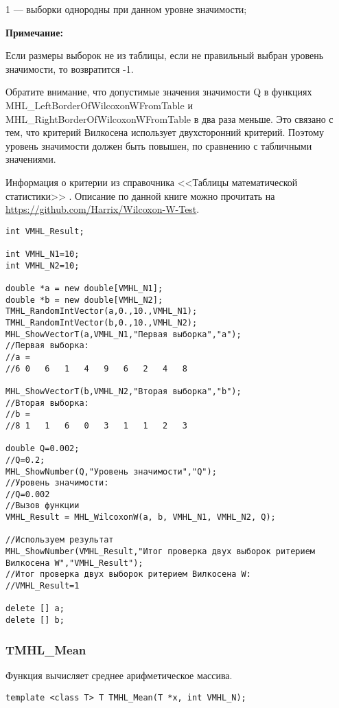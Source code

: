 \documentclass[a4paper,12pt]{article}
\begin{document}
 1 --- выборки однородны  при данном уровне значимости;

\textbf{Примечание:}

 Если размеры выборок не из таблицы, если не правильный выбран уровень значимости, то возвратится -1.
 
 Обратите внимание, что допустимые значения значимости Q в функциях MHL\_LeftBorderOfWilcoxonWFromTable и MHL\_RightBorderOfWilcoxonWFromTable в два раза меньше. Это связано с тем, что критерий Вилкосена использует двухсторонний критерий. Поэтому уровень значимости должен быть повышен, по сравнению с табличными значениями.
	 
 Информация о критерии из  справочника <<Таблицы математической статистики>> \cite[с. 93]{book:Bolshev1983}. Описание по данной книге можно прочитать на \href {https://github.com/Harrix/Wilcoxon-W-Test} {https://github.com/Harrix/Wilcoxon-W-Test}.



\begin{lstlisting}[label=code_use_MHL_WilcoxonW,caption=Пример использования]
int VMHL_Result;

int VMHL_N1=10;
int VMHL_N2=10;

double *a = new double[VMHL_N1];
double *b = new double[VMHL_N2];
TMHL_RandomIntVector(a,0.,10.,VMHL_N1);
TMHL_RandomIntVector(b,0.,10.,VMHL_N2);
MHL_ShowVectorT(a,VMHL_N1,"Первая выборка","a");
//Первая выборка:
//a =	
//6	0	6	1	4	9	6	2	4	8

MHL_ShowVectorT(b,VMHL_N2,"Вторая выборка","b");
//Вторая выборка:
//b =	
//8	1	1	6	0	3	1	1	2	3

double Q=0.002;
//Q=0.2;
MHL_ShowNumber(Q,"Уровень значимости","Q");
//Уровень значимости:
//Q=0.002
//Вызов функции
VMHL_Result = MHL_WilcoxonW(a, b, VMHL_N1, VMHL_N2, Q);

//Используем результат
MHL_ShowNumber(VMHL_Result,"Итог проверка двух выборок ритерием Вилкосена W","VMHL_Result");
//Итог проверка двух выборок ритерием Вилкосена W:
//VMHL_Result=1

delete [] a;
delete [] b;
\end{lstlisting}

\subsubsection{TMHL\_Mean}\label{TMHL_Mean}

Функция вычисляет среднее арифметическое массива.


\begin{lstlisting}[label=code_syntax_TMHL_Mean,caption=Синтаксис]
template <class T> T TMHL_Mean(T *x, int VMHL_N);
\end{lstlisting}
\end{document}
